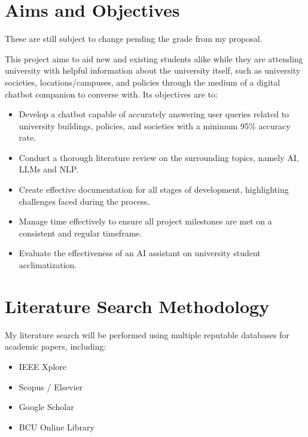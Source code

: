 \documentclass[12pt]{report}
\begin{document}
    \section{Aims and Objectives}

    \begin{tcolorbox}[colback=red!5!white,colframe=red!75!black,title=Copied from proposal]
        These are still subject to change pending the grade from my proposal.
    \end{tcolorbox}

    \noindent
    This project aims to aid new and existing students alike while they are attending university with 
    helpful information about the university itself, such as university societies, locations/campuses, 
    and policies through the medium of a digital chatbot companion to converse with.
    Its objectives are to:

    \begin{itemize}
        \item Develop a chatbot capable of accurately answering user queries related to university 
        buildings, policies, and societies with a minimum 95\% accuracy rate.
        \item Conduct a thorough literature review on the surrounding topics, namely AI, LLMs and NLP.
        \item Create effective documentation for all stages of development, highlighting challenges faced during the process.
        \item Manage time effectively to ensure all project milestones are met on a consistent and regular timeframe.
        \item Evaluate the effectiveness of an AI assistant on university student acclimatization.
    \end{itemize}

    \pagebreak %

    \section{Literature Search Methodology}

    \noindent 
    My literature search will be performed using multiple reputable databases for academic papers, including:
    \begin{itemize}
        \item IEEE Xplore
        \item Scopus / Elsevier
        \item Google Scholar
        \item BCU Online Library
    \end{itemize}
    
\end{document}
